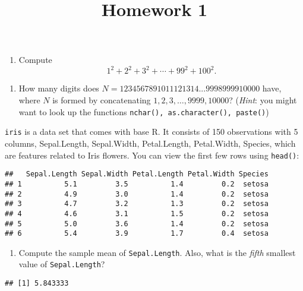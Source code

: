 \documentclass[]{article}
\title{Homework 1}
\author{}
\date{}
\providecommand{\tightlist}{%
  \setlength{\itemsep}{0pt}\setlength{\parskip}{0pt}}
\begin{document}
\maketitle

\bigskip

\begin{enumerate}
\def\labelenumi{\arabic{enumi}.}
\tightlist
\item
  Compute \[1^2+2^2+3^2+\cdots+99^2+100^2.\]
\end{enumerate}

\bigskip

\begin{enumerate}
\def\labelenumi{\arabic{enumi}.}
\setcounter{enumi}{1}
\tightlist
\item
  How many digits does \(N=1234567891011121314...9998999910000\) have,
  where \(N\) is formed by concatenating \(1,2,3,\ldots,9999,10000\)?
  (\emph{Hint}: you might want to look up the functions
  \texttt{nchar(), as.character(), paste()})
\end{enumerate}

\bigskip

\texttt{iris} is a data set that comes with base R. It consists of 150
observations with 5 columns, Sepal.Length, Sepal.Width, Petal.Length,
Petal.Width, Species, which are features related to Iris flowers. You
can view the first few rows using \texttt{head()}:

\begin{verbatim}
##   Sepal.Length Sepal.Width Petal.Length Petal.Width Species
## 1          5.1         3.5          1.4         0.2  setosa
## 2          4.9         3.0          1.4         0.2  setosa
## 3          4.7         3.2          1.3         0.2  setosa
## 4          4.6         3.1          1.5         0.2  setosa
## 5          5.0         3.6          1.4         0.2  setosa
## 6          5.4         3.9          1.7         0.4  setosa
\end{verbatim}

\begin{enumerate}
\def\labelenumi{\arabic{enumi}.}
\setcounter{enumi}{2}
\tightlist
\item
  Compute the sample mean of \texttt{Sepal.Length}. Also, what is the
  \emph{fifth} smallest value of \texttt{Sepal.Length}?
\end{enumerate}

\begin{verbatim}
## [1] 5.843333
\end{verbatim}
\end{document}
